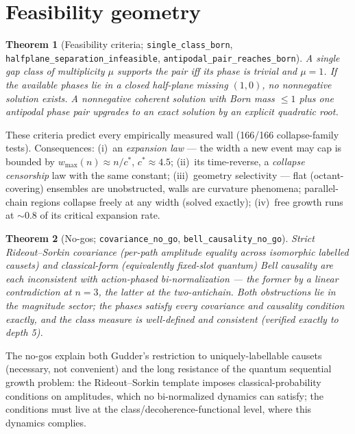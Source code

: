 \documentclass[11pt]{article}
\newtheorem{theorem}{Theorem}[section]
\begin{document}
\section{Feasibility geometry}

\begin{theorem}[Feasibility criteria;
\texttt{single\_class\_born},
\texttt{halfplane\_separation\_infeasible},
\texttt{antipodal\_pair\_reaches\_born}]
A single gap class of multiplicity $\mu$ supports the pair iff its
phase is trivial and $\mu=1$.  If the available phases lie in a closed
half-plane missing $(1,0)$, no nonnegative solution exists.  A
nonnegative coherent solution with Born mass $\le1$ plus one antipodal
phase pair upgrades to an exact solution by an explicit quadratic
root.
\end{theorem}

These criteria predict every empirically measured wall (166/166
collapse-family tests).  Consequences: (i)~an \emph{expansion law} ---
the width a new event may cap is bounded by
$w_{\max}(n)\approx n/c^*$, $c^*\approx4.5$; (ii)~its time-reverse, a
\emph{collapse censorship} law with the same constant; (iii)~geometry
selectivity --- flat (octant-covering) ensembles are unobstructed,
walls are curvature phenomena; parallel-chain regions collapse freely
at any width (solved exactly); (iv)~free growth runs at
$\sim0.8$ of its critical expansion rate.

\begin{theorem}[No-gos; \texttt{covariance\_no\_go},
\texttt{bell\_causality\_no\_go}]
Strict Rideout--Sorkin covariance (per-path amplitude equality across
isomorphic labelled causets) and classical-form (equivalently
fixed-slot quantum) Bell causality are each inconsistent with
action-phased bi-normalization --- the former by a linear
contradiction at $n=3$, the latter at the two-antichain.  Both
obstructions lie in the magnitude sector; the phases satisfy every
covariance and causality condition exactly, and the class measure is
well-defined and consistent (verified exactly to depth 5).
\end{theorem}

The no-gos explain both Gudder's restriction to uniquely-labellable
causets (necessary, not convenient) and the long resistance of the
quantum sequential growth problem: the Rideout--Sorkin template
imposes classical-probability conditions on amplitudes, which no
bi-normalized dynamics can satisfy; the conditions must live at the
class/decoherence-functional level, where this dynamics complies.
\end{document}
